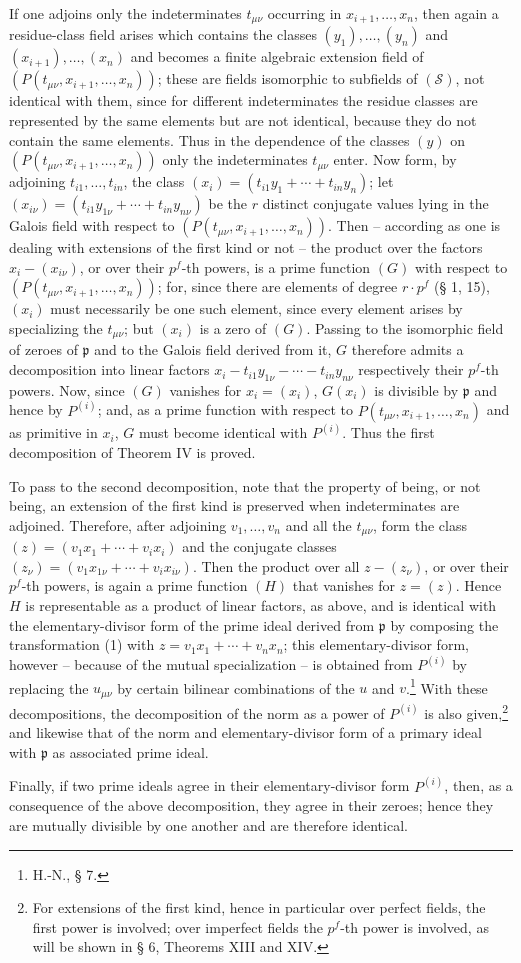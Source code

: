 \documentclass[11pt]{article}
\providecommand{\frakp}{\mathfrak p}
\begin{document}
If one adjoins only the indeterminates $t_{\mu\nu}$ occurring in $x_{i+1},\ldots,x_n$, then again a residue-class field arises which contains the classes $(y_1),\ldots,(y_n)$ and $(x_{i+1}),\ldots,(x_n)$ and becomes a finite algebraic extension field of $(P(t_{\mu\nu},x_{i+1},\ldots,x_n))$; these are fields isomorphic to subfields of $(\mathcal S)$, not identical with them, since for different indeterminates the residue classes are represented by the same elements but are not identical, because they do not contain the same elements. Thus in the dependence of the classes $(y)$ on $(P(t_{\mu\nu},x_{i+1},\ldots,x_n))$ only the indeterminates $t_{\mu\nu}$ enter. Now form, by adjoining $t_{i1},\ldots,t_{in}$, the class $(x_i)=(t_{i1}y_1+\cdots+t_{in}y_n)$; let $(x_{i\nu})=(t_{i1}y_{1\nu}+\cdots+t_{in}y_{n\nu})$ be the $r$ distinct conjugate values lying in the Galois field with respect to $(P(t_{\mu\nu},x_{i+1},\ldots,x_n))$. Then -- according as one is dealing with extensions of the first kind or not -- the product over the factors $x_i-(x_{i\nu})$, or over their $p^f$-th powers, is a prime function $(G)$ with respect to $(P(t_{\mu\nu},x_{i+1},\ldots,x_n))$; for, since there are elements of degree $r\cdot p^f$ (§ 1, 15), $(x_i)$ must necessarily be one such element, since every element arises by specializing the $t_{\mu\nu}$; but $(x_i)$ is a zero of $(G)$. Passing to the isomorphic field of zeroes of $\frakp$ and to the Galois field derived from it, $G$ therefore admits a decomposition into linear factors $x_i-t_{i1}y_{1\nu}-\cdots-t_{in}y_{n\nu}$ respectively their $p^f$-th powers. Now, since $(G)$ vanishes for $x_i=(x_i)$, $G(x_i)$ is divisible by $\frakp$ and hence by $P^{(i)}$; and, as a prime function with respect to $P(t_{\mu\nu},x_{i+1},\ldots,x_n)$ and as primitive in $x_i$, $G$ must become identical with $P^{(i)}$. Thus the first decomposition of Theorem IV is proved.

To pass to the second decomposition, note that the property of being, or not being, an extension of the first kind is preserved when indeterminates are adjoined. Therefore, after adjoining $v_1,\ldots,v_n$ and all the $t_{\mu\nu}$, form the class $(z)=(v_1x_1+\cdots+v_ix_i)$ and the conjugate classes $(z_\nu)=(v_1x_{1\nu}+\cdots+v_ix_{i\nu})$. Then the product over all $z-(z_\nu)$, or over their $p^f$-th powers, is again a prime function $(H)$ that vanishes for $z=(z)$. Hence $H$ is representable as a product of linear factors, as above, and is identical with the elementary-divisor form of the prime ideal derived from $\frakp$ by composing the transformation (1) with $z=v_1x_1+\cdots+v_nx_n$; this elementary-divisor form, however -- because of the mutual specialization -- is obtained from $P^{(i)}$ by replacing the $u_{\mu\nu}$ by certain bilinear combinations of the $u$ and $v$.\footnote{H.-N., § 7.} With these decompositions, the decomposition of the norm as a power of $P^{(i)}$ is also given,\footnote{For extensions of the first kind, hence in particular over perfect fields, the first power is involved; over imperfect fields the $p^f$-th power is involved, as will be shown in § 6, Theorems XIII and XIV.} and likewise that of the norm and elementary-divisor form of a primary ideal with $\frakp$ as associated prime ideal.

Finally, if two prime ideals agree in their elementary-divisor form $P^{(i)}$, then, as a consequence of the above decomposition, they agree in their zeroes; hence they are mutually divisible by one another and are therefore identical.
\end{document}

